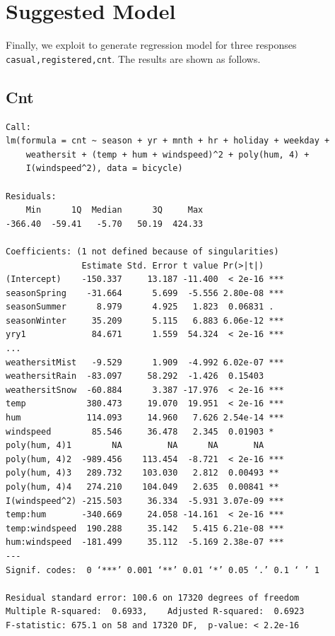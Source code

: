 \section{Suggested Model}
\label{sec:model}

Finally, we exploit {\mlr} to generate regression model for three responses \texttt{casual,registered,cnt}. The results are shown as follows.

\subsection{Cnt}
\begin{lstlisting}[style=rlanguage]
Call:
lm(formula = cnt ~ season + yr + mnth + hr + holiday + weekday +
    weathersit + (temp + hum + windspeed)^2 + poly(hum, 4) +
    I(windspeed^2), data = bicycle)

Residuals:
    Min      1Q  Median      3Q     Max
-366.40  -59.41   -5.70   50.19  424.33

Coefficients: (1 not defined because of singularities)
               Estimate Std. Error t value Pr(>|t|)
(Intercept)    -150.337     13.187 -11.400  < 2e-16 ***
seasonSpring    -31.664      5.699  -5.556 2.80e-08 ***
seasonSummer      8.979      4.925   1.823  0.06831 .
seasonWinter     35.209      5.115   6.883 6.06e-12 ***
yry1             84.671      1.559  54.324  < 2e-16 ***
...
weathersitMist   -9.529      1.909  -4.992 6.02e-07 ***
weathersitRain  -83.097     58.292  -1.426  0.15403
weathersitSnow  -60.884      3.387 -17.976  < 2e-16 ***
temp            380.473     19.070  19.951  < 2e-16 ***
hum             114.093     14.960   7.626 2.54e-14 ***
windspeed        85.546     36.478   2.345  0.01903 *
poly(hum, 4)1        NA         NA      NA       NA
poly(hum, 4)2  -989.456    113.454  -8.721  < 2e-16 ***
poly(hum, 4)3   289.732    103.030   2.812  0.00493 **
poly(hum, 4)4   274.210    104.049   2.635  0.00841 **
I(windspeed^2) -215.503     36.334  -5.931 3.07e-09 ***
temp:hum       -340.669     24.058 -14.161  < 2e-16 ***
temp:windspeed  190.288     35.142   5.415 6.21e-08 ***
hum:windspeed  -181.499     35.112  -5.169 2.38e-07 ***
---
Signif. codes:  0 ‘***’ 0.001 ‘**’ 0.01 ‘*’ 0.05 ‘.’ 0.1 ‘ ’ 1

Residual standard error: 100.6 on 17320 degrees of freedom
Multiple R-squared:  0.6933,	Adjusted R-squared:  0.6923
F-statistic: 675.1 on 58 and 17320 DF,  p-value: < 2.2e-16
\end{lstlisting}

